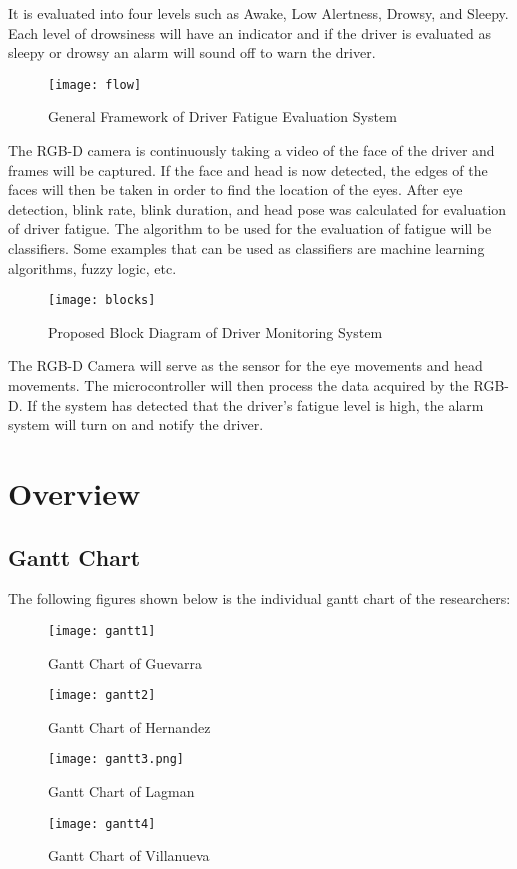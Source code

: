 \newpage
It is evaluated into four levels such as Awake, Low Alertness, Drowsy, and Sleepy. Each level of drowsiness will have an indicator and if the driver is evaluated as sleepy or drowsy an alarm will sound off to warn the driver. 
\newpage
\begin{center}
\begin{figure}[ht]
	\centering
	\texttt{[image: flow]}
	\caption{General Framework of Driver Fatigue Evaluation System}
\end{figure}
\end{center}


The RGB-D camera is continuously taking a video of the face of the driver and frames will be captured. If the face and head is now detected, the edges of the faces will then be taken in order to find the location of the eyes. After eye detection, blink rate, blink duration, and head pose was calculated for evaluation of driver fatigue. The algorithm to be used for the evaluation of fatigue will be classifiers. Some examples that can be used as classifiers are machine learning algorithms, fuzzy logic, etc. 


\begin{center}
	\begin{figure}[ht]
		\centering
		\texttt{[image: blocks]}
		\caption{Proposed Block Diagram of Driver Monitoring System}
	\end{figure}
\end{center}
\newpage 
The RGB-D Camera will serve as the sensor for the eye movements and head movements. The microcontroller will then process the data acquired by the RGB-D. If the system has detected that the driver’s fatigue level is high, the alarm system will turn on and notify the driver. 
\section{Overview}

\subsection{Gantt Chart}
\newpage
The following figures shown below is the individual gantt chart of the researchers:

\begin{figure}[!htb]
	\centering
	\texttt{[image: gantt1]}
	\caption{Gantt Chart of Guevarra}
\end{figure}
\begin{figure}[!htb]
	\centering
	\texttt{[image: gantt2]}
	\caption{Gantt Chart of Hernandez}
\end{figure}
\begin{figure}[!htb]
	\centering
	\texttt{[image: gantt3.png]}
	\caption{Gantt Chart of Lagman}
\end{figure}
\begin{figure}[!htb]
	\centering
	\texttt{[image: gantt4]}
	\caption{Gantt Chart of Villanueva}
\end{figure}
\newpage
\newpage

